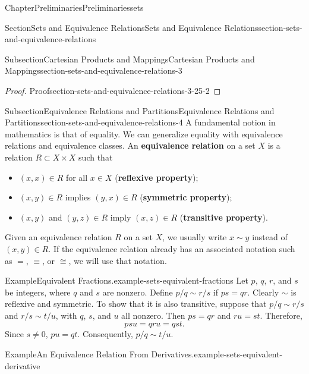 \documentclass[oneside,10pt,]{book}
\newcommand{\terminology}[1]{\textbf{#1}}
\numberwithin{equation}{section}
\begin{document}
\begin{chapterptx}{Chapter}{Preliminaries}{}{Preliminaries}{}{}{sets}
\begin{sectionptx}{Section}{Sets and Equivalence Relations}{}{Sets and Equivalence Relations}{}{}{section-sets-and-equivalence-relations}
\begin{subsectionptx}{Subsection}{Cartesian Products and Mappings}{}{Cartesian Products and Mappings}{}{}{section-sets-and-equivalence-relations-3}
\begin{proof}{Proof}{}{section-sets-and-equivalence-relations-3-25-2}
\end{proof}
\end{subsectionptx}
%
%
\typeout{************************************************}
\typeout{************************************************}
%
\begin{subsectionptx}{Subsection}{Equivalence Relations and Partitions}{}{Equivalence Relations and Partitions}{}{}{section-sets-and-equivalence-relations-4}
A fundamental notion in mathematics is that of equality.  We can generalize equality with equivalence relations and equivalence classes.  An \terminology{equivalence relation} on a set \(X\) is a relation \(R \subset X \times X\) such that%
\begin{itemize}[label=\textbullet]
\item{}\((x, x) \in R\) for all \(x \in X\) (\terminology{reflexive property});%
\item{}\((x, y) \in R\) implies \((y, x) \in R\) (\terminology{symmetric property});%
\item{}\((x, y)\) and \((y, z) \in R\) imply \((x, z) \in R\) (\terminology{transitive property}).%
\end{itemize}
%
\par
Given an equivalence relation \(R\)  on a set \(X\), we usually write  \(x \sim y\) instead of \((x, y) \in R\). If the equivalence relation already has an associated notation such as \(=\), \(\equiv\), or \(\cong\), we will use that notation.%
\begin{example}{Example}{Equivalent Fractions.}{example-sets-equivalent-fractions}%
Let \(p\), \(q\), \(r\), and \(s\) be integers, where \(q\) and \(s\) are nonzero.  Define \(p/q \sim r/s\) if \(ps = qr\).  Clearly \(\sim\) is reflexive and symmetric.  To show that it is also transitive, suppose that \(p/q \sim r/s\) and \(r/s \sim t/u\), with \(q\), \(s\), and \(u\) all nonzero.  Then \(ps = qr\) and \(ru = st\). Therefore,%
\begin{equation*}
psu = qru = qst\text{.}
\end{equation*}
Since \(s \neq 0\), \(pu = qt\). Consequently, \(p/q \sim t/u\).%
\end{example}
\begin{example}{Example}{An Equivalence Relation From Derivatives.}{example-sets-equivalent-derivative}%

\end{example}
\end{subsectionptx}
\end{sectionptx}
\end{chapterptx}
\end{document}
